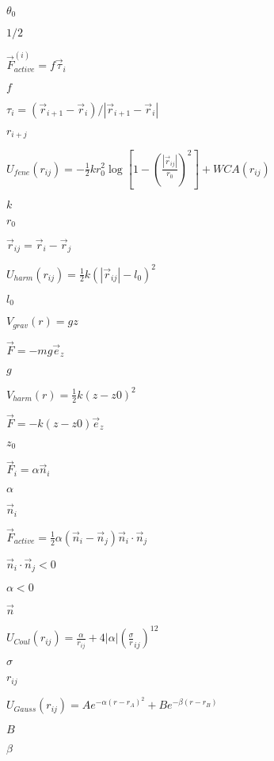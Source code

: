 \documentclass{article}
\begin{document}
$ \theta_0 $
\pagebreak

$ 1/2 $
\pagebreak

$ \vec F^{(i)}_{active} = f\vec\tau_i $
\pagebreak

$ f $
\pagebreak

$ \tau_i = (\vec r_{i+1} - \vec r_i)/|\vec r_{i+1} - \vec r_i| $
\pagebreak

$ r_{i+j} $
\pagebreak

$ U_{fene}\left(r_{ij}\right) = -\frac{1}{2}kr_0^2\log\left[1-\left(\frac{\left|\vec r_{ij}\right|}{r_0}\right)^2\right] + WCA(r_{ij})$
\pagebreak

$ k $
\pagebreak

$ r_0 $
\pagebreak

$ \vec r_{ij} = \vec r_i - \vec r_j $
\pagebreak

$ U_{harm}\left(r_{ij}\right) = \frac{1}{2}k\left(\left|\vec r_{ij}\right|-l_0\right)^2 $
\pagebreak

$ l_0 $
\pagebreak

$ V_{grav}\left(r\right) = g z $
\pagebreak

$ \vec F = - m g \vec e_z $
\pagebreak

$ g $
\pagebreak

$ V_{harm}\left(r\right) = \frac{1}{2} k (z-z0)^2 $
\pagebreak

$ \vec F = - k (z - z0) \vec e_z $
\pagebreak

$ z_0 $
\pagebreak

$ \vec F_i = \alpha \vec n_i $
\pagebreak

$ \alpha $
\pagebreak

$ \vec n_i $
\pagebreak

$ \vec F_{active} = \frac {1}{2}\alpha\left(\vec n_i-\vec n_j \right)\vec n_i \cdot \vec n_j $
\pagebreak

$ \vec n_i \cdot \vec n_j < 0 $
\pagebreak

$ \alpha < 0 $
\pagebreak

$ \vec n $
\pagebreak

$ U_{Coul}\left(r_{ij}\right) = \frac{\alpha}{r_{ij}} + 4\left|\alpha\right|\left(\frac \sigma r_{ij}\right)^{12} $
\pagebreak

$ \sigma $
\pagebreak

$ r_{ij} $
\pagebreak

$ U_{Gauss}\left(r_{ij}\right) = A e^{-\alpha(r-r_A)^2} + B e^{-\beta(r-r_B)} $
\pagebreak

$ B $
\pagebreak

$ \beta $
\pagebreak
\end{document}
